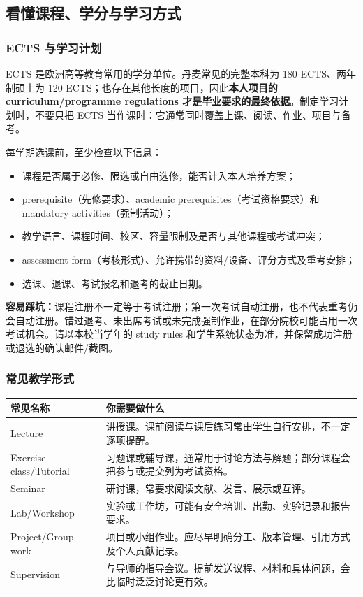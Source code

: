 \subsection{看懂课程、学分与学习方式}

\subsubsection*{ECTS 与学习计划}

ECTS 是欧洲高等教育常用的学分单位。丹麦常见的完整本科为 180 ECTS、两年制硕士为 120 ECTS；也存在其他长度的项目，因此\textbf{本人项目的 curriculum/programme regulations 才是毕业要求的最终依据}。制定学习计划时，不要只把 ECTS 当作课时：它通常同时覆盖上课、阅读、作业、项目与备考。

每学期选课前，至少检查以下信息：

\begin{itemize}
  \item 课程是否属于必修、限选或自由选修，能否计入本人培养方案；
  \item prerequisite（先修要求）、academic prerequisites（考试资格要求）和 mandatory activities（强制活动）；
  \item 教学语言、课程时间、校区、容量限制及是否与其他课程或考试冲突；
  \item assessment form（考核形式）、允许携带的资料/设备、评分方式及重考安排；
  \item 选课、退课、考试报名和退考的截止日期。
\end{itemize}

\begin{grayleftbox}
\textbf{容易踩坑：}课程注册不一定等于考试注册；第一次考试自动注册，也不代表重考仍会自动注册。错过退考、未出席考试或未完成强制作业，在部分院校可能占用一次考试机会。请以本校当学年的 study rules 和学生系统状态为准，并保留成功注册或退选的确认邮件/截图。
\end{grayleftbox}

\subsubsection*{常见教学形式}

\noindent\begin{tabularx}{\textwidth}{@{}p{}X@{}}
\toprule
常见名称 & 你需要做什么 \\
\midrule
Lecture & 讲授课。课前阅读与课后练习常由学生自行安排，不一定逐项提醒。 \\
Exercise class/Tutorial & 习题课或辅导课，通常用于讨论方法与解题；部分课程会把参与或提交列为考试资格。 \\
Seminar & 研讨课，常要求阅读文献、发言、展示或互评。 \\
Lab/Workshop & 实验或工作坊，可能有安全培训、出勤、实验记录和报告要求。 \\
Project/Group work & 项目或小组作业。应尽早明确分工、版本管理、引用方式及个人贡献记录。 \\
Supervision & 与导师的指导会议。提前发送议程、材料和具体问题，会比临时泛泛讨论更有效。 \\
\bottomrule
\end{tabularx}

